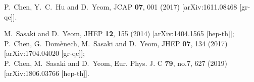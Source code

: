 \documentclass{andromedaone}
\begin{document}
\begin{thebibliography}{99}
P.~Chen, Y.~C.~Hu and D.~Yeom,
JCAP \textbf{07}, 001 (2017)
[arXiv:1611.08468 [gr-qc]].

M.~Sasaki and D.~Yeom,
JHEP \textbf{12}, 155 (2014)
[arXiv:1404.1565 [hep-th]];\\
P.~Chen, G.~Dom\`enech, M.~Sasaki and D.~Yeom,
JHEP \textbf{07}, 134 (2017)
[arXiv:1704.04020 [gr-qc]];\\
P.~Chen, M.~Sasaki and D.~Yeom,
Eur. Phys. J. C \textbf{79}, no.7, 627 (2019)
[arXiv:1806.03766 [hep-th]].




\end{thebibliography}
\end{document}

